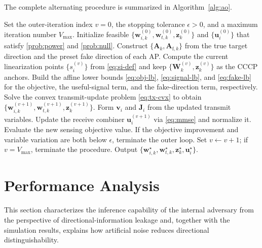\documentclass[conference,twocolumn,a4paper]{IEEEtran}
\begin{document}
The complete alternating procedure is summarized in Algorithm~\ref{alg:ao}.

\begin{algorithm}[t]
\caption{CCCP-MMSE Alternating Secure Sensing Design Procedure}
\label{alg:ao}
\begin{algorithmic}[1]
\State Set the outer-iteration index $v=0$, the stopping tolerance $\epsilon>0$, and a maximum iteration number $V_{\max}$.
\State Initialize feasible $\{\mathbf{w}_{i,k}^{(0)},\mathbf{w}_{t,k}^{(0)},\mathbf{z}_k^{(0)}\}$ and $\{\mathbf{u}_i^{(0)}\}$ that satisfy \eqref{prob:power} and \eqref{prob:null}.
\State Construct $\{\mathbf{A}_k,\mathbf{A}_{\mathrm{f},k}\}$ from the true target direction and the preset fake direction of each AP.
    \State Compute the current linearization points $\{s_i^{(v)}\}$ from \eqref{eq:si-def} and keep $\{\mathbf{W}_k^{(v)},\mathbf{z}_k^{(v)}\}$ as the CCCP anchors.
    \State Build the affine lower bounds \eqref{eq:obj-lb}, \eqref{eq:signal-lb}, and \eqref{eq:fake-lb} for the objective, the useful-signal term, and the fake-direction term, respectively.
    \State Solve the convex transmit-update problem \eqref{eq:tx-cvx} to obtain $\{\mathbf{w}_{i,k}^{(v+1)},\mathbf{w}_{t,k}^{(v+1)},\mathbf{z}_k^{(v+1)}\}$.
        \State Form $\mathbf{v}_i$ and $\mathbf{J}_i$ from the updated transmit variables.
        \State Update the receive combiner $\mathbf{u}_i^{(v+1)}$ via \eqref{eq:mmse} and normalize it.
    \EndFor
    \State Evaluate the new sensing objective value.
    \State If the objective improvement and variable variation are both below $\epsilon$, terminate the outer loop.
    \State Set $v\leftarrow v+1$; if $v=V_{\max}$, terminate the procedure.
\EndFor
\State Output $\{\mathbf{w}_{i,k}^\star,\mathbf{w}_{t,k}^\star,\mathbf{z}_k^\star,\mathbf{u}_i^\star\}$.
\end{algorithmic}
\end{algorithm}

\section{Performance Analysis}
This section characterizes the inference capability of the internal adversary from the perspective of directional-information leakage and, together with the simulation results, explains how artificial noise reduces directional distinguishability.
\end{document}
